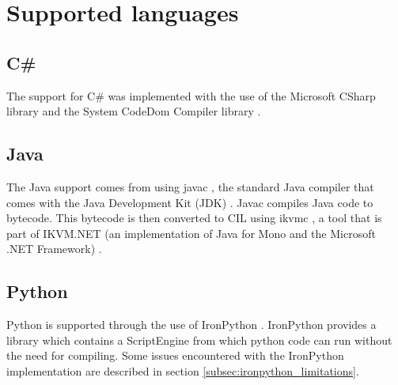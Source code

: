 \section{Supported languages}

\subsection{C\#}
The support for C\# was implemented with the use of the Microsoft CSharp library \cite{MicrosoftCSharp} and the System CodeDom Compiler library \cite{CodeDomCompiler}.

\subsection{Java}
The Java support comes from using javac \cite{Javac}, the standard Java compiler that comes with the Java Development Kit (JDK) \cite{JDK}. Javac compiles Java code to bytecode. This bytecode is then converted to CIL using ikvmc \cite{IKVMC}, a tool that is part of IKVM.NET (an implementation of Java for Mono and the Microsoft .NET Framework) \cite{IKVM.NET}. 

\subsection{Python}
Python is supported through the use of IronPython \cite{IronPython}. IronPython provides a library which contains a ScriptEngine from which python code can run without the need for compiling. Some issues encountered with the IronPython implementation are described in section \ref{subsec:ironpython_limitations}.